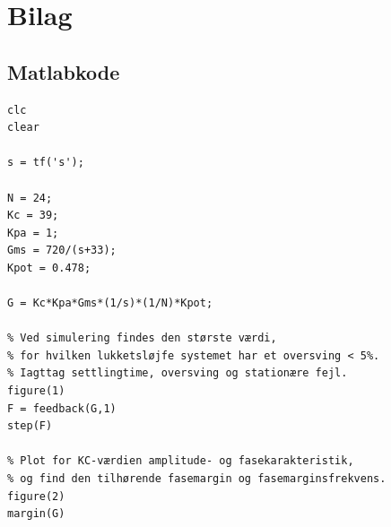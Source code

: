 \documentclass[]{report}
\begin{document}
\newpage
\section{Bilag}
\subsection{Matlabkode}
\begin{lstlisting}[frame=single]
%% Forberedelse a)
clc
clear

s = tf('s');

N = 24;
Kc = 39;
Kpa = 1;
Gms = 720/(s+33);  
Kpot = 0.478;

G = Kc*Kpa*Gms*(1/s)*(1/N)*Kpot;

% Ved simulering findes den største værdi,
% for hvilken lukketsløjfe systemet har et oversving < 5%.
% Iagttag settlingtime, oversving og stationære fejl. 
figure(1)
F = feedback(G,1)
step(F)

% Plot for KC-værdien amplitude- og fasekarakteristik,
% og find den tilhørende fasemargin og fasemarginsfrekvens.
figure(2)
margin(G)
\end{lstlisting}
\end{document}
